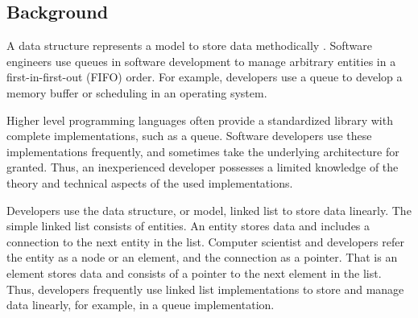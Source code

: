 \documentclass[a4paper,11pt]{kth-mag}
\newcommand*{\skippara}{\par\vspace{\baselineskip} \noindent}
\begin{document}
\subsection{Background}\label{sec:background}
A data structure represents a model to store data methodically \cite{deshpande2004c}.
Software engineers use queues in software development to manage arbitrary entities in a first-in-first-out (FIFO) order.
For example, developers use a queue to develop a memory buffer or scheduling in an operating system.

\skippara Higher level programming languages often provide a standardized library with complete implementations, such as a queue.
Software developers use these implementations frequently, and sometimes take the underlying architecture for granted.
Thus, an inexperienced developer possesses a limited knowledge of the theory and technical aspects of the used implementations.

\skippara Developers use the data structure, or model, linked list to store data linearly.
The simple linked list consists of entities.
An entity stores data and includes a connection to the next entity in the list.
Computer scientist and developers refer the entity as a node or an element, and the connection as a pointer.
That is an element stores data and consists of a pointer to the next element in the list.
Thus, developers frequently use linked list implementations to store and manage data linearly, for example, in a queue implementation.


\end{document}
